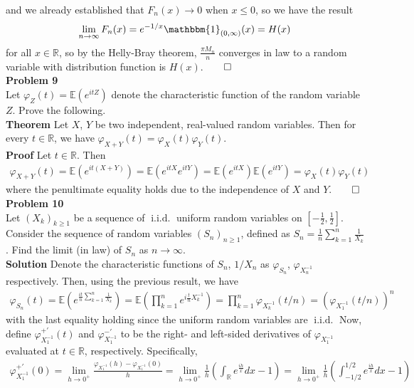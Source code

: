 \documentclass[10pt]{article}
\newcommand{\E}{\mathbb{E}}
\newcommand{\bp}[1]{\left({#1}\right)}
\newcommand{\mbb}[1]{\mathbb{#1}}
\newcommand{\1}[1]{\mathbbm{1}_{#1}}
\DeclareMathOperator{\iid}{i.i.d.}
\begin{document}
    and we already established that $F_n(x)\rightarrow 0$ when $x\leq 0$, so we have the result
    \[\lim_{n\rightarrow\infty}F_n(x)=e^{-1/x}\1{(0,\infty)}(x)=H(x)\]
    for all $x\in\mbb{R}$, so by the Helly-Bray theorem, $\tfrac{\pi M_n}{n}$ converges in law to a random variable with distribution function is $H(x)$.\hfill{$\qed$}\\[5pt]
    {\bf Problem 9}\\[5pt]
    Let $\varphi_Z(t)=\E{(e^{itZ})}$ denote the characteristic function of the random variable $Z$. Prove the following.\\[5pt]
    {\bf Theorem}\hspace{5pt} Let $X$, $Y$ be two independent, real-valued random variables. Then for every $t\in\mbb{R}$, we have $\varphi_{X+Y}(t)=\varphi_X(t)\varphi_Y(t)$.\\[5pt]
    {\bf Proof}\hspace{5pt} Let $t\in\mbb{R}$. Then
    \begin{align*}
        \varphi_{X+Y}(t)=\E{(e^{it(X+Y)})}=\E{(e^{itX}e^{itY})}=\E{(e^{itX})}\E{(e^{itY})}=\varphi_X(t)\varphi_Y(t)
    \end{align*}
    where the penultimate equality holds due to the independence of $X$ and $Y$.\hfill{$\qed$}\\[5pt]
    {\bf Problem 10}\\[5pt]
    Let $(X_k)_{k\geq 1}$ be a sequence of $\iid$ uniform random variables on $\left[-\tfrac{1}{2},\tfrac{1}{2}\right]$. Consider the sequence of random variables $(S_n)_{n\geq 1}$, defined as
    $S_n=\tfrac{1}{n}\sum_{k=1}^n\tfrac{1}{X_k}$. Find the limit (in law) of $S_n$ as $n\rightarrow\infty$.\\[5pt]
    {\bf Solution}\hspace{5pt} Denote the characteristic functions of $S_n$, $1/X_n$ as $\varphi_{S_n}$, $\varphi_{X_n^{-1}}$ respectively. Then, using the previous result, we have
    \begin{align*}
        \varphi_{S_n}(t)=\E{\bp{e^{\tfrac{it}{n}\sum_{k=1}^n\tfrac{1}{X_k}}}}=\E{\bp{\prod_{k=1}^ne^{i\tfrac{t}{n}X_k^{-1}}}}=\prod_{k=1}^n\varphi_{X_k^{-1}}(t/n)=(\varphi_{X_1^{-1}}(t/n))^n
    \end{align*}
    with the last equality holding since the uniform random variables are $\iid$ Now, define $\varphi_{X_1^{-1}}^{+\prime}(t)$ and $\varphi_{X_1^{-1}}^{-\prime}$ to be the right- and left-sided derivatives of $\varphi_{X_1^{-1}}$ evaluated at $t\in\mbb{R}$, respectively. Specifically,
    \begin{align*}
        \varphi_{X_1^{-1}}^{+\prime}(0)=\lim_{h\rightarrow 0^+}\frac{\varphi_{X_1^{-1}}(h)-\varphi_{X_1^{-1}}(0)}{h}=\lim_{h\rightarrow 0^+}\frac{1}{h}\bp{\int_\mbb{R}e^{\tfrac{ih}{x}}dx-1}=\lim_{h\rightarrow 0^+}\frac{1}{h}\bp{\int_{-1/2}^{1/2}e^{\tfrac{ih}{x}}dx-1}
    \end{align*}
\end{document}
